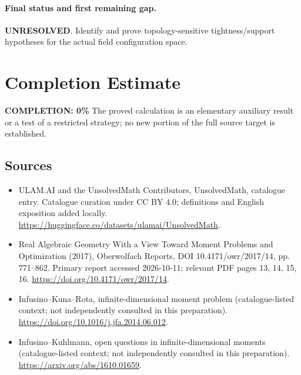 \documentclass[11pt]{article}
\begin{document}
\paragraph{Final status and first remaining gap.}
\textbf{UNRESOLVED}. Identify and prove topology-sensitive tightness/support hypotheses for the actual field configuration space.

\section{Completion Estimate}
\noindent\textbf{COMPLETION: 0\%}
The proved calculation is an elementary auxiliary result or a test of a restricted strategy; no new portion of the full source target is established.

\subsection{Sources}
\begin{itemize}
\item[\hypertarget{source:statement:1}{S1}] ULAM.AI and the UnsolvedMath Contributors, UnsolvedMath, catalogue entry. Catalogue curation under CC BY 4.0; definitions and English exposition added locally.
\url{https://huggingface.co/datasets/ulamai/UnsolvedMath}.
\item[\hypertarget{source:statement:2}{S2}] Real Algebraic Geometry With a View Toward Moment Problems and Optimization (2017), Oberwolfach Reports, DOI 10.4171/owr/2017/14, pp. 771--862. Primary report accessed 2026-10-11; relevant PDF pages 13, 14, 15, 16.
\url{https://doi.org/10.4171/owr/2017/14}.
\item[\hypertarget{source:statement:3}{S3}] Infusino--Kuna--Rota, infinite-dimensional moment problem (catalogue-listed context; not independently consulted in this preparation).
\url{https://doi.org/10.1016/j.jfa.2014.06.012}.
\item[\hypertarget{source:statement:4}{S4}] Infusino--Kuhlmann, open questions in infinite-dimensional moments (catalogue-listed context; not independently consulted in this preparation).
\url{https://arxiv.org/abs/1610.01659}.
\end{itemize}
\label{end:statement}
\end{document}
